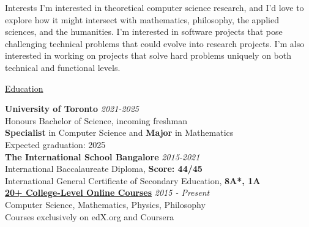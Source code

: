 \documentclass{resume} %
\begin{document}

\begin{rSection}{Interests}
    I'm interested in theoretical computer science research, and I'd love to explore how it might intersect with mathematics, philosophy, the applied sciences, and the humanities. I'm interested in software projects that pose challenging technical problems that could evolve into research projects. I'm also interested in working on projects that solve hard problems uniquely on both technical and functional levels.
\end{rSection}

\begin{rSection}{\href{ https://www.nitvishn.net/\#/education }{Education}}

{\bf University of Toronto} \hfill {\em 2021-2025} \\ 
Honours Bachelor of Science, incoming freshman \\
\textbf{Specialist} in Computer Science and \textbf{Major} in Mathematics \smallskip \\
Expected graduation: 2025  \\

{\bf The International School Bangalore} \hfill {\em 2015-2021} \\ 
International Baccalaureate Diploma, \textbf{Score: 44/45}  \\
International General Certificate of Secondary Education, \textbf{8A*, 1A}\\

{\bf \href{ https://www.nitvishn.net/#/education }{20+ College-Level Online Courses}} \hfill{\em 2015 - Present}\\
Computer Science, Mathematics, Physics, Philosophy  \\
Courses exclusively on edX.org and Coursera\\

\end{rSection}

\end{document}
